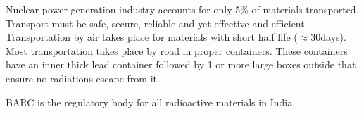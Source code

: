 \documentclass[pdftex,12pt,a4paper]{article}
\begin{document}
Nuclear power generation industry accounts for only 5\% of materials transported. Transport must be safe, secure, reliable and yet effective and efficient. Transportation by air takes place for materials with short half life ($\approx$30days). Most transportation takes place by road in proper containers. These containers have an inner thick lead container followed by 1 or more large boxes outside that ensure no radiations escape from it. 

BARC is the regulatory body for all radioactive materials in India.
\end{document}
